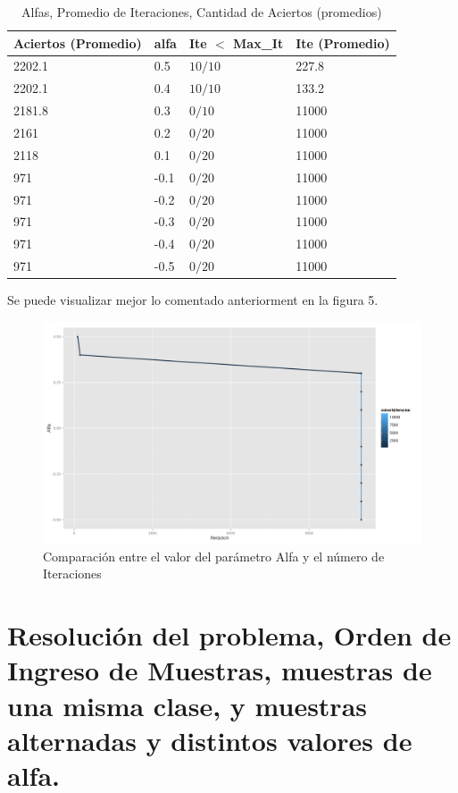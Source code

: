 \documentclass[8.5pt,twoside,twocolumn]{article}
\begin{document}
    \begin{table}[h]
        \small
        \caption{ Alfas, Promedio de Iteraciones, Cantidad de Aciertos (promedios) }
        \label{tbl:example}
        \begin{tabular*}{0.5\textwidth}{@{\extracolsep{\fill}}llll}
        \hline
        Aciertos (Promedio) & alfa & Ite $<$ Max\_It & Ite (Promedio)\\
        \hline
        2202.1 & 0.5 & $10/10$ &  227.8\\
        2202.1  & 0.4 & $10/10$ & 133.2  \\
        2181.8 & 0.3 & $0/10$ &  11000 \\
        2161   & 0.2 & $0/20$ & 11000 \\
        2118  & 0.1 & $0/20$ & 11000 \\
        971  & -0.1 & $0/20$ & 11000 \\
        971  & -0.2 & $0/20$ & 11000 \\
        971  & -0.3 & $0/20$ & 11000 \\
        971  & -0.4 & $0/20$ & 11000 \\
        971  & -0.5 & $0/20$ & 11000 \\
        \hline
        \end{tabular*}
        \end{table}
 Se puede visualizar mejor lo comentado anteriorment  en la figura 5.
	\begin{figure}[h]
	  \centering
	  \includegraphics[scale=0.2]{adult_alfa_iteracion_escalado.png}
	  \caption{Comparaci\'on entre el valor del par\'ametro Alfa y el n\'umero de Iteraciones}
	  \label{fgr:alfaIteracion}
	\end{figure}


\section{ Resoluci\'on del problema, Orden de Ingreso de Muestras, muestras de una misma clase, y muestras alternadas y distintos valores de alfa.}
\end{document}

